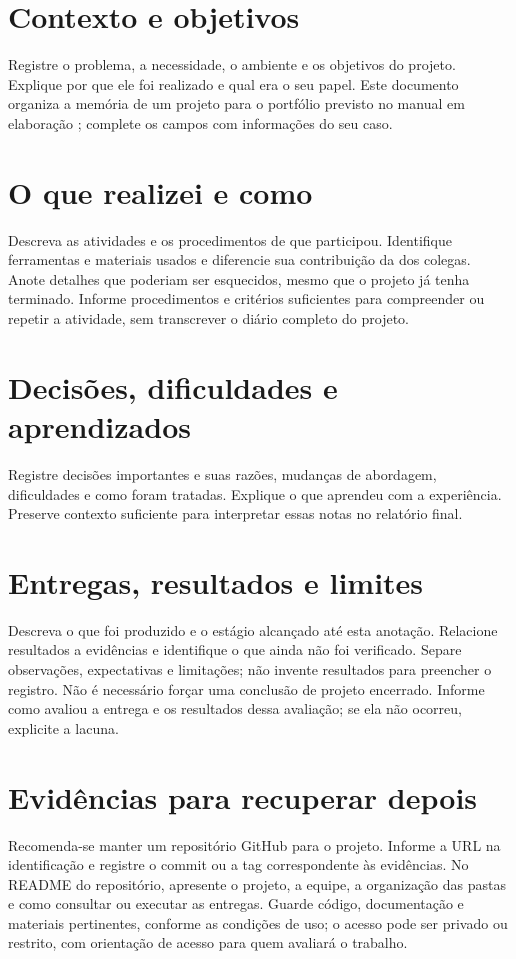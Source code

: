\section*{Contexto e objetivos}
Registre o problema, a necessidade, o ambiente e os objetivos do projeto.
Explique por que ele foi realizado e qual era o seu papel. Este documento
organiza a memória de um projeto para o portfólio previsto no manual em
elaboração ; complete os campos com informações do seu caso.

\section*{O que realizei e como}
Descreva as atividades e os procedimentos de que participou. Identifique
ferramentas e materiais usados e diferencie sua contribuição da dos colegas.
Anote detalhes que poderiam ser esquecidos, mesmo que o projeto já tenha terminado.
Informe procedimentos e critérios suficientes para compreender ou repetir
a atividade, sem transcrever o diário completo do projeto.

\section*{Decisões, dificuldades e aprendizados}
Registre decisões importantes e suas razões, mudanças de abordagem,
dificuldades e como foram tratadas. Explique o que aprendeu com a experiência.
Preserve contexto suficiente para interpretar essas notas no relatório final.

\section*{Entregas, resultados e limites}
Descreva o que foi produzido e o estágio alcançado até esta anotação.
Relacione resultados a evidências e identifique o que ainda não foi verificado.
Separe observações, expectativas e limitações; não invente resultados para
preencher o registro. Não é necessário forçar uma conclusão de projeto encerrado.
Informe como avaliou a entrega e os resultados dessa avaliação; se ela não
ocorreu, explicite a lacuna.

\section*{Evidências para recuperar depois}
Recomenda-se manter um repositório GitHub para o projeto. Informe a URL na
identificação e registre o commit ou a tag correspondente às evidências.
No README do repositório, apresente o projeto, a equipe, a organização das
pastas e como consultar ou executar as entregas. Guarde código, documentação
e materiais pertinentes, conforme as condições de uso; o acesso pode ser
privado ou restrito, com orientação de acesso para quem avaliará o trabalho.

